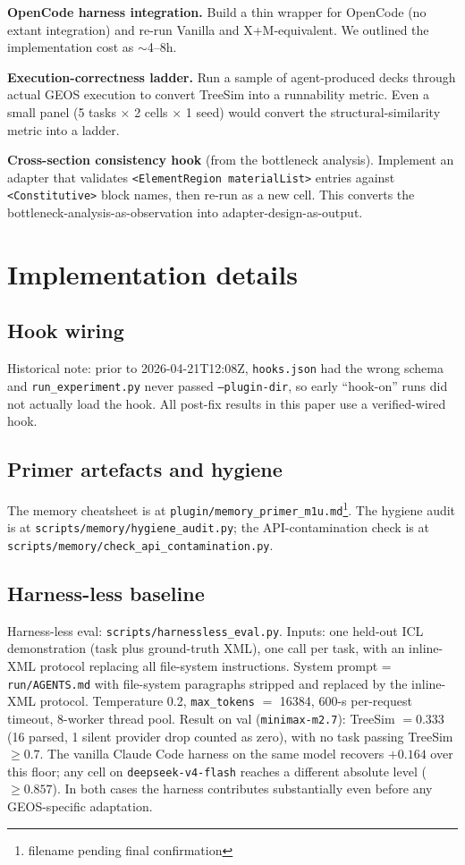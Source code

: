 \documentclass{article}
\begin{document}
\textbf{OpenCode harness integration.} Build a thin wrapper for OpenCode (no extant integration) and re-run Vanilla and X+M-equivalent. We outlined the implementation cost as $\sim$4--8h.

\textbf{Execution-correctness ladder.} Run a sample of agent-produced decks through actual GEOS execution to convert TreeSim into a runnability metric. Even a small panel (5 tasks × 2 cells × 1 seed) would convert the structural-similarity metric into a ladder.

\textbf{Cross-section consistency hook} (from the bottleneck analysis). Implement an adapter that validates \texttt{<ElementRegion materialList>} entries against \texttt{<Constitutive>} block names, then re-run as a new cell. This converts the bottleneck-analysis-as-observation into adapter-design-as-output.

\section{Implementation details}
\label{app:impl}

\subsection{Hook wiring}
Historical note: prior to 2026-04-21T12:08Z, \texttt{hooks.json} had the wrong schema and \texttt{run\_experiment.py} never passed \texttt{--plugin-dir}, so early ``hook-on'' runs did not actually load the hook. All post-fix results in this paper use a verified-wired hook.

\subsection{Primer artefacts and hygiene}
The memory cheatsheet is at \texttt{plugin/memory\_primer\_m1u.md}\footnote{filename pending final confirmation}. The hygiene audit is at \texttt{scripts/memory/hygiene\_audit.py}; the API-contamination check is at \texttt{scripts/memory/check\_api\_contamination.py}.

\subsection{Harness-less baseline}
\label{subsec:harnessless}
Harness-less eval: \texttt{scripts/harnessless\_eval.py}. Inputs: one held-out ICL demonstration (task plus ground-truth XML), one call per task, with an inline-XML protocol replacing all file-system instructions. System prompt = \texttt{run/AGENTS.md} with file-system paragraphs stripped and replaced by the inline-XML protocol. Temperature 0.2, \texttt{max\_tokens} $=$ 16384, 600-s per-request timeout, 8-worker thread pool. Result on val (\texttt{minimax-m2.7}): TreeSim $= 0.333$ (16 parsed, 1 silent provider drop counted as zero), with no task passing TreeSim $\geq 0.7$. The vanilla Claude Code harness on the same model recovers ${+}0.164$ over this floor; any cell on \texttt{deepseek-v4-flash} reaches a different absolute level ($\geq 0.857$). In both cases the harness contributes substantially even before any GEOS-specific adaptation.
\end{document}
